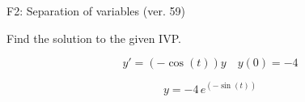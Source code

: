 \begin{exercise}
  \begin{exerciseTitle}F2: Separation of variables (ver. 59)\end{exerciseTitle}
  \begin{exerciseStatement}
    
Find the solution to the given IVP.

    
\[y'=( -\cos\left(t\right) )y\hspace{1em} y(0)= -4\]

  \end{exerciseStatement}
  \begin{exerciseAnswer}
    
\[y= -4 \, e^{\left(-\sin\left(t\right)\right)}\]

  \end{exerciseAnswer}
\end{exercise}